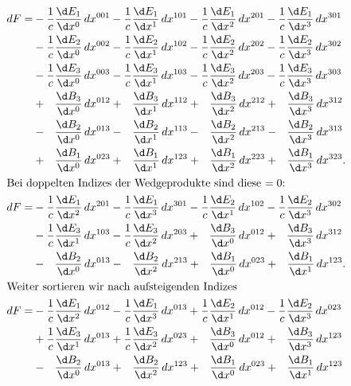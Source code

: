 \begin{align*}	
 	dF =
 	& -  \frac{1}{c} \frac{\d E_1}{\d x^0} \, dx^{001} - \frac{1}{c} \frac{\d E_1}{\d x^1} \, dx^{101}
 	- \frac{1}{c} \frac{\d E_1}{\d x^2} \, dx^{201} - \frac{1}{c} \frac{\d E_1}{\d x^3} \, dx^{301}
 	\\
 	&- \frac{1}{c} \frac{\d E_2}{\d x^0} \, dx^{002} - \frac{1}{c} \frac{\d E_2}{\d x^1} \, dx^{102}
 	 - \frac{1}{c} \frac{\d E_2}{\d x^2} \, dx^{202} - \frac{1}{c} \frac{\d E_2}{\d x^3} \, dx^{302}
 	\\
 	& - \frac{1}{c} \frac{\d E_3}{\d x^0} \, dx^{003} - \frac{1}{c} \frac{\d E_3}{\d x^1} \, dx^{103}
 	- \frac{1}{c} \frac{\d E_3}{\d x^2} \, dx^{203} - \frac{1}{c} \frac{\d E_3}{\d x^3} \, dx^{303}
 	\\
 	&+ \phantom{\frac{1}{c}}\frac{\d B_3}{\d x^0} \, dx^{012} + \phantom{\frac{1}{c}}\frac{\d B_3}{\d x^1} \, dx^{112}
 	+ \phantom{\frac{1}{c}}\frac{\d B_3}{\d x^2} \, dx^{212} + \phantom{\frac{1}{c}}\frac{\d B_3}{\d x^3} \, dx^{312}
 	\\
 	&- \phantom{\frac{1}{c}}\frac{\d B_2}{\d x^0} \, dx^{013} - \phantom{\frac{1}{c}}\frac{\d B_2}{\d x^1} \, dx^{113}
 	- \phantom{\frac{1}{c}}\frac{\d B_2}{\d x^2} \, dx^{213} - \phantom{\frac{1}{c}}\frac{\d B_2}{\d x^3} \, dx^{313}
 	\\
 	&+ \phantom{\frac{1}{c}}\frac{\d B_1}{\d x^0} \, dx^{023} + \phantom{\frac{1}{c}}\frac{\d B_1}{\d x^1} \, dx^{123}
 	+ \phantom{\frac{1}{c}}\frac{\d B_1}{\d x^2} \, dx^{223} + \phantom{\frac{1}{c}}\frac{\d B_1}{\d x^3} \, dx^{323} .
 	\\
	\intertext{Bei doppelten Indizes der Wedgeprodukte sind diese $=0$:}
	dF
 	=
 	&- \frac{1}{c} \frac{\d E_1}{\d x^2} \, dx^{201} - \frac{1}{c} \frac{\d E_1}{\d x^3} \, dx^{301}
 	 - \frac{1}{c} \frac{\d E_2}{\d x^1} \, dx^{102} - \frac{1}{c} \frac{\d E_2}{\d x^3} \, dx^{302}
 	\\
 	&- \frac{1}{c} \frac{\d E_3}{\d x^1} \, dx^{103} - \frac{1}{c} \frac{\d E_3}{\d x^2} \, dx^{203}
 	 + \phantom{\frac{1}{c}} \frac{\d B_3}{\d x^0} \, dx^{012} + \phantom{\frac{1}{c}} \frac{\d B_3}{\d x^3} \, dx^{312}
 	\\
 	&- \phantom{\frac{1}{c}} \frac{\d B_2}{\d x^0} \, dx^{013} - \phantom{\frac{1}{c}} \frac{\d B_2}{\d x^2} \, dx^{213}
 	 + \phantom{\frac{1}{c}} \frac{\d B_1}{\d x^0} \, dx^{023} + \phantom{\frac{1}{c}} \frac{\d B_1}{\d x^1} \, dx^{123} .  
	\\
	\intertext{Weiter sortieren wir nach aufsteigenden Indizes}
	dF =
	&- \frac{1}{c} \frac{\d E_1}{\d x^2} \, dx^{012} - \frac{1}{c} \frac{\d E_1}{\d x^3} \, dx^{013}
	 + \frac{1}{c} \frac{\d E_2}{\d x^1} \, dx^{012} - \frac{1}{c} \frac{\d E_2}{\d x^3} \, dx^{023}
	\\
	&+ \frac{1}{c} \frac{\d E_3}{\d x^1} \, dx^{013} + \frac{1}{c} \frac{\d E_3}{\d x^2} \, dx^{023}
	 + \phantom{\frac{1}{c}} \frac{\d B_3}{\d x^0} \, dx^{012} + \phantom{\frac{1}{c}} \frac{\d B_3}{\d x^3} \, dx^{123}
	\\
	&- \phantom{\frac{1}{c}} \frac{\d B_2}{\d x^0} \, dx^{013} + \phantom{\frac{1}{c}} \frac{\d B_2}{\d x^2} \, dx^{123}
	 + \phantom{\frac{1}{c}} \frac{\d B_1}{\d x^0} \, dx^{023} + \phantom{\frac{1}{c}} \frac{\d B_1}{\d x^1} \, dx^{123}
\end{align*}
